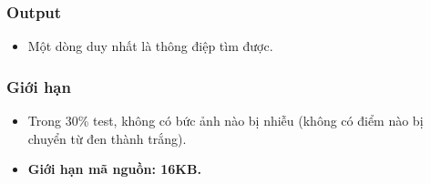 \subsubsection{   Output  }
\begin{itemize}
	\item 

     Một dòng duy nhất là thông điệp tìm được.    
\end{itemize}

\subsubsection{   Giới hạn  }
\begin{itemize}
	\item 

     Trong 30\% test, không có bức ảnh nào bị nhiễu (không có điểm nào bị chuyển từ đen thành trắng).    
	\item 

\textbf{      Giới hạn mã nguồn: 16KB.     }
\end{itemize}

